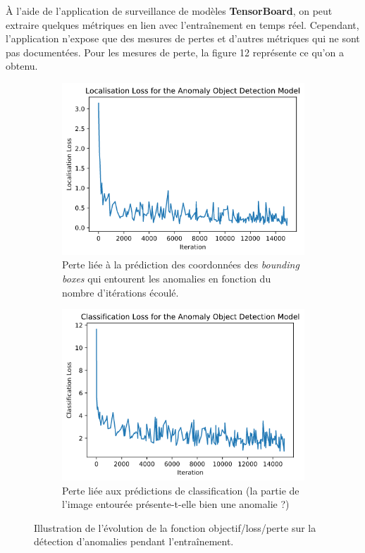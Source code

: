 \documentclass[french]{article}
\theoremstyle{mytheoremstyle}
\theoremstyle{mytheoremstyle}
\theoremstyle{myproblemstyle}
\begin{document}
    À l'aide de l'application de surveillance de modèles \textbf{TensorBoard}, on peut extraire quelques métriques en lien avec l'entraînement en temps réel. Cependant, l'application n'expose que des mesures de pertes et d'autres métriques qui ne sont pas documentées. Pour les mesures de perte, la figure 12 représente ce qu'on a obtenu.
    \begin{figure}[H]
    \centering
    \begin{subfigure}[t]{0.49\textwidth}
            \centering
            \includegraphics[width=1\textwidth]{images/od_loc_loss.png}
            \caption{Perte liée à la prédiction des coordonnées des \emph{bounding boxes} qui entourent les anomalies en fonction du nombre d'itérations écoulé.}
    \end{subfigure}%
    \hfill
    \begin{subfigure}[t]{0.49\textwidth}
            \centering
            \includegraphics[width=1\textwidth]{images/od_cla_loss.png}
           	\caption{Perte liée aux prédictions de classification (la partie de l'image entourée présente-t-elle bien une anomalie ?)}
    \end{subfigure}
    \caption{Illustration de l'évolution de la fonction objectif/loss/perte sur la détection d'anomalies pendant l'entraînement.}
    \end{figure}
    
\end{document}

